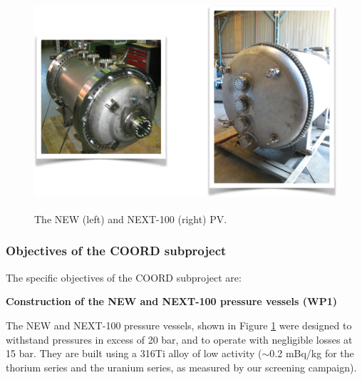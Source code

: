 %
%

\begin{figure}
\centering
\includegraphics[height=8cm]{img/PV.png}
\caption{The NEW (left) and NEXT-100 (right) PV.} \label{fig:PV}
\end{figure}


\subsubsection*{Objectives of the COORD subproject}

The specific objectives of the COORD subproject are:

{\bf Construction of the NEW and NEXT-100 pressure vessels (WP1)}

The NEW and NEXT-100 pressure vessels, shown in Figure \ref{fig:PV} were designed to withstand pressures in excess of 20 bar, and to operate with negligible losses at 15 bar. They are built using a 316Ti alloy of low activity ($\sim$0.2 mBq/kg for the thorium series and 
the uranium series, as measured by our screening campaign). 

